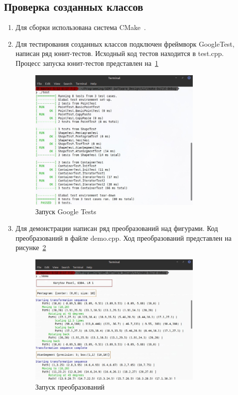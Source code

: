 \documentclass[a4paper, 14pt]{extarticle}
\begin{document}
\FloatBarrier{}
\subsection{Проверка созданных классов}
\begin{enumerate}
    \item Для сборки использована система CMake~\cite{cmake}.
    \item Для тестирования созданных классов подключен фреймворк GoogleTest, написан ряд юнит-тестов. Исходный код тестов находится в test.cpp.\\
    Процесс запуска юнит-тестов представлен на~\ref{img:shapes:tests}
    \begin{figure}[h]
        \centering
        \includegraphics[width=0.8\textwidth]{./img/S001.jpg}
        \caption{Запуск Google Tests}%
        \label{img:shapes:tests}
    \end{figure}
    \item Для демонстрации написан ряд преобразований над фигурами. Код преобразований в файле demo.cpp. Ход преобразований представлен на рисунке~\ref{img:shapes:demo}
    \begin{figure}[h]
        \centering
        \includegraphics[width=0.8\textwidth]{./img/S002.jpg}
        \caption{Запуск преобразований}%
        \label{img:shapes:demo}
    \end{figure}


\end{enumerate}
\end{document}
